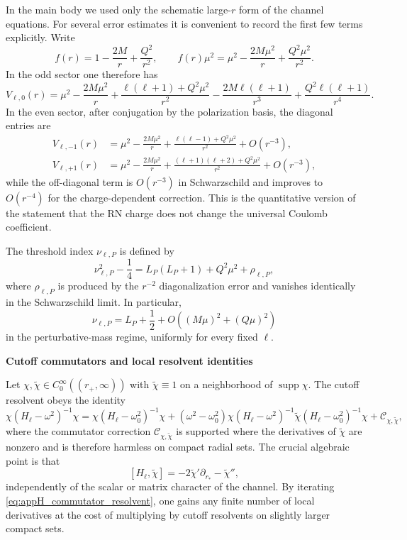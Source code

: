 \documentclass[12pt]{article}
\numberwithin{equation}{section}
\theoremstyle{plain}
\theoremstyle{definition}
\theoremstyle{remark}
\newcommand{\om}{\omega}
\newcommand{\appheading}[1]{\par\medskip\noindent\textbf{#1}\par\smallskip\noindent}
\begin{document}
In the main body we used only the schematic large-$r$ form of the channel equations.  For several error estimates it is convenient to record the first few terms explicitly.  Write
\[
   f(r)=1-\frac{2M}{r}+\frac{Q^2}{r^2},
   \qquad
   f(r)\mu^2
   =
   \mu^2-\frac{2M\mu^2}{r}+\frac{Q^2\mu^2}{r^2}.
\]
In the odd sector one therefore has
\begin{equation}\label{eq:appH_odd_expansion}
   V_{\ell,0}(r)
   =
   \mu^2-\frac{2M\mu^2}{r}
   +\frac{\ell(\ell+1)+Q^2\mu^2}{r^2}
   -\frac{2M\ell(\ell+1)}{r^3}
   +\frac{Q^2\ell(\ell+1)}{r^4}.
\end{equation}
In the even sector, after conjugation by the polarization basis, the diagonal entries are
\begin{align}
   V_{\ell,-1}(r)
   &=
   \mu^2-\frac{2M\mu^2}{r}
   +\frac{\ell(\ell-1)+Q^2\mu^2}{r^2}
   +O(r^{-3}),\label{eq:appH_even_minus}\\
   V_{\ell,+1}(r)
   &=
   \mu^2-\frac{2M\mu^2}{r}
   +\frac{(\ell+1)(\ell+2)+Q^2\mu^2}{r^2}
   +O(r^{-3}),\label{eq:appH_even_plus}
\end{align}
while the off-diagonal term is $O(r^{-3})$ in Schwarzschild and improves to $O(r^{-4})$ for the charge-dependent correction.  This is the quantitative version of the statement that the RN charge does not change the universal Coulomb coefficient.

The threshold index $\nu_{\ell,P}$ is defined by
\[
   \nu_{\ell,P}^2-\frac14
   =
   L_P(L_P+1)+Q^2\mu^2+\rho_{\ell,P},
\]
where $\rho_{\ell,P}$ is produced by the $r^{-2}$ diagonalization error and vanishes identically in the Schwarzschild limit.  In particular,
\[
   \nu_{\ell,P}=L_P+\frac12+O((M\mu)^2+(Q\mu)^2)
\]
in the perturbative-mass regime, uniformly for every fixed $\ell$.

\appheading{Cutoff commutators and local resolvent identities}

Let $\chi,\widetilde\chi\in C_0^\infty((r_+,\infty))$ with $\widetilde\chi\equiv1$ on a neighborhood of $\operatorname{supp}\chi$.  The cutoff resolvent obeys the identity
\begin{equation}\label{eq:appH_commutator_resolvent}
   \chi(H_\ell-\om^2)^{-1}\chi
   =
   \chi(H_\ell-\om_0^2)^{-1}\chi
   +(\om^2-\om_0^2)\chi(H_\ell-\om^2)^{-1}\widetilde\chi(H_\ell-\om_0^2)^{-1}\chi
   +\mathcal C_{\chi,\widetilde\chi},
\end{equation}
where the commutator correction $\mathcal C_{\chi,\widetilde\chi}$ is supported where the derivatives of $\widetilde\chi$ are nonzero and is therefore harmless on compact radial sets.  The crucial algebraic point is that
\[
   [H_\ell,\widetilde\chi]
   =
   -2\widetilde\chi'\partial_{r_*}-\widetilde\chi'',
\]
independently of the scalar or matrix character of the channel.  By iterating \eqref{eq:appH_commutator_resolvent}, one gains any finite number of local derivatives at the cost of multiplying by cutoff resolvents on slightly larger compact sets.
\end{document}
